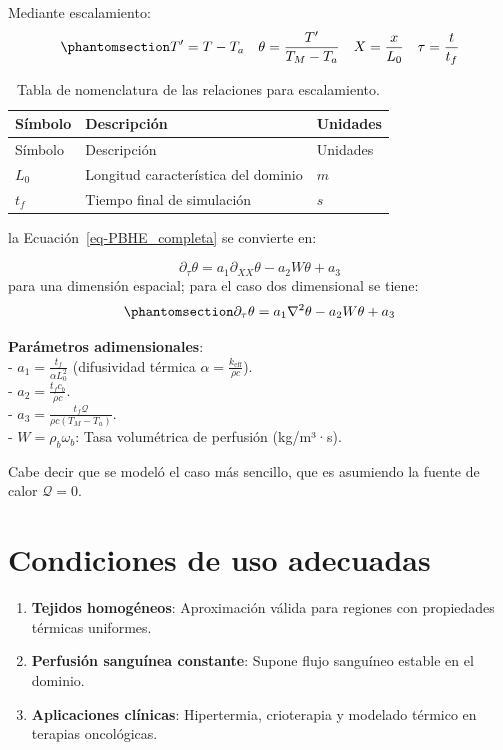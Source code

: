 \documentclass[
  spanish,
  us-letterpaper,
]{scrreprt}
\providecommand{\tightlist}{%
  \setlength{\itemsep}{0pt}\setlength{\parskip}{0pt}}
\theoremstyle{plain}
\theoremstyle{definition}
\theoremstyle{remark}
\begin{document}
Mediante escalamiento:
\begin{equation}\phantomsection\label{eq-adimencionalizadores}{
T' = T - T_a \quad \theta = \dfrac{T'}{T_M - T_a} \quad X = \dfrac{x}{L_0} \quad \tau = \dfrac{t}{t_f}
}\end{equation}

\begin{longtable}[]{@{}lll@{}}
\caption{Tabla de nomenclatura de las relaciones para
escalamiento.}\label{tbl-}\tabularnewline
\toprule\noalign{}
Símbolo & Descripción & Unidades \\
\midrule\noalign{}
\endfirsthead
\toprule\noalign{}
Símbolo & Descripción & Unidades \\
\midrule\noalign{}
\endhead
\bottomrule\noalign{}
\endlastfoot
\(L_0\) & Longitud característica del dominio & \(m\) \\
\(t_f\) & Tiempo final de simulación & \(s\) \\
\end{longtable}

la Ecuación~\ref{eq-PBHE_completa} se convierte en:

\[
\partial_{\tau} \theta = a_1 \partial_{XX} \theta - a_2 W \theta + a_3
\] para una dimensión espacial; para el caso dos dimensional se tiene:
\begin{equation}\phantomsection\label{eq-PBHE-reduced}{
\partial_{\tau} \theta = a_1 \nabla^2  \theta - a_2 W \theta + a_3
}\end{equation}

\textbf{Parámetros adimensionales}:\\
- \(a_1 = \frac{t_f}{\alpha L_0^2}\) (difusividad térmica
\(\alpha = \frac{k_{\text{eff}}}{\rho c}\)).\\
- \(a_2 = \frac{t_f c_b}{\rho c}\).\\
- \(a_3 = \frac{t_f \mathcal{Q}}{\rho c (T_M - T_a)}\).\\
- \(W = \rho_b \omega_b\): Tasa volumétrica de perfusión (kg/m³·s).

Cabe decir que se modeló el caso más sencillo, que es asumiendo la
fuente de calor \(\mathcal{Q} = 0\).

\section{Condiciones de uso
adecuadas}\label{condiciones-de-uso-adecuadas}

\begin{enumerate}
\def\labelenumi{\arabic{enumi}.}
\tightlist
\item
  \textbf{Tejidos homogéneos}: Aproximación válida para regiones con
  propiedades térmicas uniformes.\\
\item
  \textbf{Perfusión sanguínea constante}: Supone flujo sanguíneo estable
  en el dominio.\\
\item
  \textbf{Aplicaciones clínicas}: Hipertermia, crioterapia y modelado
  térmico en terapias oncológicas.
\end{enumerate}
\end{document}
